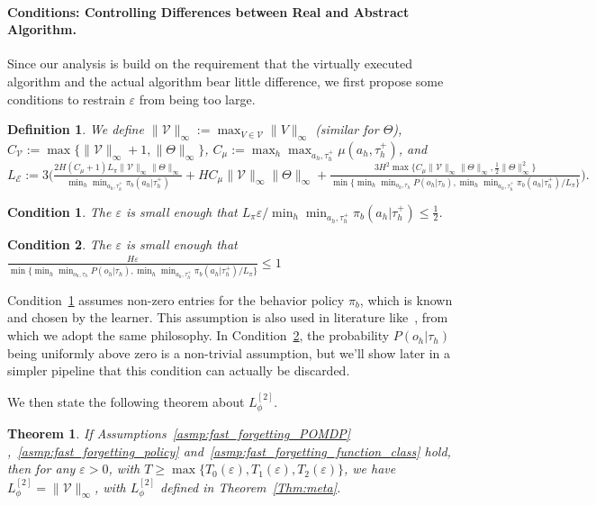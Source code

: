\documentclass[twoside]{article}
\newtheorem{theorem}{Theorem}
\newtheorem{definition}{Definition}
\newtheorem{condition}{Condition}
\newcommand{\CAL}[1]{\mathcal{#1}}
\newcommand{\zyh}[1]{{\color{blue}{ [\textbf{Youheng:}} #1]}}
\newcommand{\yplu}[1]{{\color{orange}{ [\textbf{Yiping:}} #1]}}
\begin{document}
\paragraph{Conditions: Controlling Differences between Real and Abstract Algorithm.} %
Since our analysis is build on the requirement that the virtually executed algorithm and the actual algorithm bear little difference, we first propose some conditions to restrain $\varepsilon$ from being too large.
\begin{definition}
    We define $\|\CAL{V}\|_\infty:=\max_{V\in\CAL{V}}\|V\|_\infty$ (similar for $\Theta$), $C_{\CAL{V}}:=\max\{\|\CAL{V}\|_\infty+1,\|\Theta\|_\infty\}$, $C_\mu := \max_h \max_{a_h, \tau_h^+} \mu(a_h, \tau_h^+)$, and
$
L_{\CAL{E}}:=3\big(\frac{2H{(C_\mu+1)L_\pi\|\CAL{V}\|_\infty\|\Theta\|_\infty}}{\min_h\min_{a_h,\tau_h^+}\pi_b(a_h|\tau_h^+)}+HC_\mu\|\CAL{V}\|_\infty\|\Theta\|_\infty + \frac{3 H^2 \max\{C_\mu\|\CAL{V}\|_\infty\|\Theta\|_\infty, \frac{1}{2}\|\Theta\|_\infty^2\}}{\min\{\min_h\min_{o_h,\tau_h}P(o_h|\tau_h), \min_h\min_{a_h,\tau_h^+}\pi_b(a_h|\tau_h^+)/L_\pi\}}\big).
$
\end{definition}
\begin{condition}\label{cond:0}
    The $\varepsilon$ is small enough that $L_\pi\varepsilon/\min_h\min_{a_h,\tau_h^+}\pi_b(a_h|\tau_h^+)\leq \frac{1}{2}$.
\end{condition}
\begin{condition}\label{cond:1}
    The $\varepsilon$ is small enough that $\frac{H \varepsilon}{\min\{\min_h\min_{o_h,\tau_h}P(o_h|\tau_h), \min_h\min_{a_h,\tau_h^+}\pi_b(a_h|\tau_h^+)/L_\pi\}}\leq 1$
\end{condition}
Condition~\ref{cond:0} assumes non-zero entries for the behavior policy $\pi_b$, which is known and chosen by the learner. This assumption is also used in literature like~\cite{zhang2025statistical}, from which we adopt the same philosophy.
In Condition~\ref{cond:1}, the probability $P(o_h|\tau_h)$ being uniformly above zero is a non-trivial assumption, but we'll show later in a simpler pipeline that this condition can actually be discarded.

We then state the following theorem about $L_\phi^{[2]}$.
\begin{theorem}\label{Thm:def_Lphi_fdvf}
If Assumptions~\ref{asmp:fast_forgetting_POMDP}%
,~\ref{asmp:fast_forgetting_policy} and~\ref{asmp:fast_forgetting_function_class} hold, then for any $\varepsilon > 0$, with $T \geq \max\{T_0(\varepsilon),T_1(\varepsilon),T_2(\varepsilon)\}$, we have $L_\phi^{[2]}=\|\CAL{V}\|_\infty$, with $L_\phi^{[2]}$ defined in Theorem~\ref{Thm:meta}.
\end{theorem}
\end{document}
